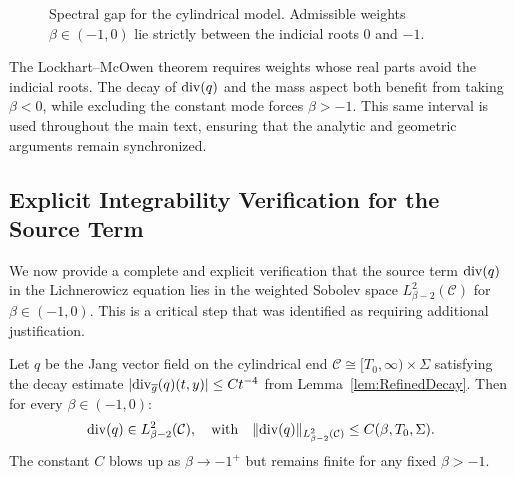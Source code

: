 \begin{figure}[htbp]
\centering
{}
\caption{Spectral gap for the cylindrical model.  Admissible weights $\beta \in (-1,0)$ lie strictly between the indicial roots $0$ and $-1$.}
\label{fig:SpectralGap}
\end{figure}

\begin{remark}
The Lockhart--McOwen theorem requires weights whose real parts avoid the indicial roots.  The decay of $\mathrm{div}(q)$ and the mass aspect both benefit from taking $\beta<0$, while excluding the constant mode forces $\beta> -1$.  This same interval is used throughout the main text, ensuring that the analytic and geometric arguments remain synchronized.
\end{remark}

\subsection{Explicit Integrability Verification for the Source Term}
\label{sec:ExplicitIntegrability}

We now provide a complete and explicit verification that the source term $\mathrm{div}(q)$ in the Lichnerowicz equation lies in the weighted Sobolev space $L^2_{\beta-2}(\mathcal{C})$ for $\beta \in (-1, 0)$. This is a critical step that was identified as requiring additional justification.

\begin{theorem}\label{thm:SourceIntegrability}
Let $q$ be the Jang vector field on the cylindrical end $\mathcal{C} \cong [T_0, \infty) \times \Sigma$ satisfying the decay estimate $|\mathrm{div}_{\overline{g}}(q)(t,y)| \le C t^{-4}$ from Lemma~\ref{lem:RefinedDecay}. Then for every $\beta \in (-1, 0)$:
\begin{equation}
    \mathrm{div}(q) \in L^2_{\beta-2}(\mathcal{C}), \quad \text{with} \quad \|\mathrm{div}(q)\|_{L^2_{\beta-2}(\mathcal{C})} \le C(\beta, T_0, \Sigma).
\end{equation}
The constant $C$ blows up as $\beta \to -1^+$ but remains finite for any fixed $\beta > -1$.
\end{theorem}

